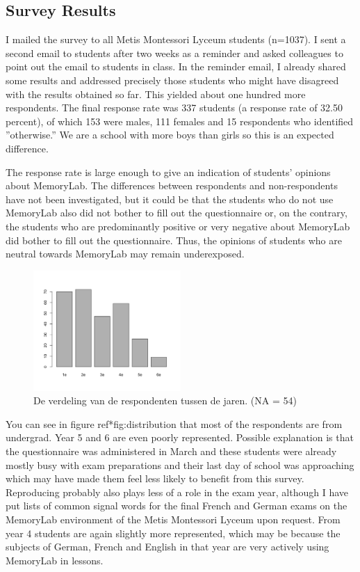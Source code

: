 \documentclass[12pt, a4paper]{article}
\begin{document}
\subsection*{Survey Results}
I mailed the survey to all Metis Montessori Lyceum students (n=1037). I sent a second email to students after two weeks as a reminder and asked colleagues to point out the email to students in class. In the reminder email, I already shared some results and addressed precisely those students who might have disagreed with the results obtained so far. This yielded about one hundred more respondents. The final response rate was 337 students (a response rate of 32.50 percent), of which 153 were males, 111 females and 15 respondents who identified ''otherwise.'' We are a school with more boys than girls so this is an expected difference.

The response rate is large enough to give an indication of students' opinions about MemoryLab. The differences between respondents and non-respondents have not been investigated, but it could be that the students who do not use MemoryLab also did not bother to fill out the questionnaire or, on the contrary, the students who are predominantly positive or very negative about MemoryLab did bother to fill out the questionnaire. Thus, the opinions of students who are neutral towards MemoryLab may remain underexposed.

\begin{figure}[h]
    \centering
    \includegraphics[width=0.5\textwidth]{Verdeling klassen.png}
    \caption{De verdeling van de respondenten tussen de jaren. (NA = 54)}
    \label{fig:verdeling}
    \end{figure}

You can see in figure {ref*{fig:distribution}} that most of the respondents are from undergrad. Year 5 and 6 are even poorly represented. Possible explanation is that the questionnaire was administered in March and these students were already mostly busy with exam preparations and their last day of school was approaching which may have made them feel less likely to benefit from this survey. Reproducing probably also plays less of a role in the exam year, although I have put lists of common signal words for the final French and German exams on the MemoryLab environment of the Metis Montessori Lyceum upon request. From year 4 students are again slightly more represented, which may be because the subjects of German, French and English in that year are very actively using MemoryLab in lessons.
\end{document}
